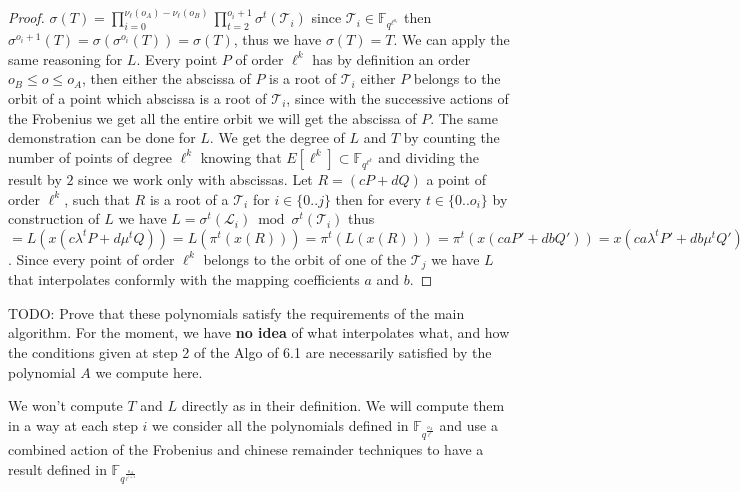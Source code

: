 \documentclass{lms}
\newcommand{\todo}[1]{{\color{red}TODO: #1}}
\begin{document}
\begin{proof}
$\sigma(T)=\prod_{i=0}^{\nu_{\ell}(o_A)-\nu_{\ell}(o_B)}\prod_{t=2}^{o_i+1}\sigma^{t}(\mathcal{T}_i)$
since $\mathcal{T}_i \in \mathbb{F}_{q^{\ell^{o_i}}}$ then $\sigma^{o_i+1}(T)=\sigma(\sigma^{o_i}(T))=\sigma(T)$, thus we have $\sigma(T)=T$. We can apply the same reasoning for $L$.
\newline
Every point $P$ of order $\ell^k$ has by definition an order $o_B \leqslant o \leqslant o_A$, then either the abscissa of $P$ is a root of $\mathcal{T}_i$ either $P$ belongs to the orbit of a point which abscissa is a root of $\mathcal{T}_i$, since with the successive actions of the Frobenius we get all the entire orbit we will get the abscissa of $P$. The same demonstration can be done for $L$. We get the degree of $L$ and $T$ by counting the number of points of degree $\ell^k$ knowing that $E[\ell^{k}] \subset \mathbb{F}_{q^{\ell^k}}$ and dividing the result by $2$ since we work only with abscissas.
\newline 
Let $R=(cP+dQ)$ a point of order $\ell^k$, such that $R$ is a root of a $\mathcal{T}_i$ for $i \in \{ 0 ..j \} $ then  for every $t \in \{0..o_i \}$ by construction of $L$ we have  $L = \sigma^{t}(\mathcal{L}_i)  \bmod  \sigma^{t}(\mathcal{T}_i)$ thus  $=L(x(c\lambda^tP+d\mu^tQ))=L(\pi^t(x(R)))=\pi^t(L(x(R)))=\pi^t(x(caP'+dbQ'))=x(ca\lambda^tP'+db\mu^tQ')$. Since every point of order $\ell^k$ belongs to the orbit of one of the $\mathcal{T}_j$ we have $L$ that interpolates conformly with the mapping coefficients $a$ and $b$.
\end{proof}

\todo{Prove that these polynomials satisfy the requirements of the 
main algorithm. For the moment, we have {\bf no idea} of what interpolates
what, and how the conditions given at step 2 of the Algo of 6.1 
are necessarily satisfied by the polynomial $A$ we compute here.}




We won't compute $T$ and $L$ directly as in their definition. We will compute them in a way at each step $i$ we consider all the polynomials defined in $\mathbb{F}_{q^{\frac{o_A}{\ell^i}}}$ and use a combined action of the Frobenius and chinese remainder techniques to have a result defined in $\mathbb{F}_{q^{\frac{o_A}{\ell^{i+1}}}}$
  
\end{document}
